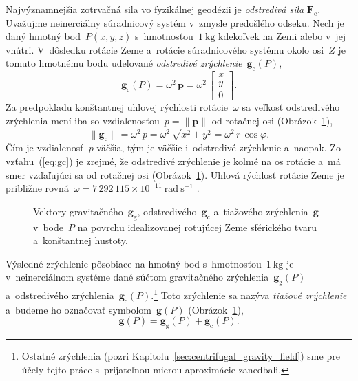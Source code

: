 \documentclass[a4paper,12pt]{book}
\newcommand{\gidx}{\mathrm g}
\newcommand{\cidx}{\mathrm c}
\let\vec\mathbf
\begin{document}
Najvýznamnejšia zotrvačná sila vo fyzikálnej geodézii je \emph{odstredivá sila}
$\vec F_\cidx$.  Uvažujme neinerciálny súradnicový systém v~zmysle predošlého
odseku.  Nech je daný hmotný bod~$P(x, y, z)$ s~hmotnosťou~$1\ \mathrm{kg}$ 
kdekoľvek na Zemi alebo v~jej vnútri.  V~dôsledku rotácie Zeme a~rotácie 
súradnicového systému okolo osi~$Z$ je tomuto hmotnému bodu udeľované 
\emph{odstredivé zrýchlenie}~$\vec g_\cidx(P)$,
%
\begin{equation}
\label{eq:gc}
\vec g_\cidx(P) = \omega^2 \, \vec p =
%
\omega^2 \, \begin{bmatrix}
x\\
y\\
0
\end{bmatrix}
%
{.}
\end{equation}
%
Za predpokladu konštantnej uhlovej rýchlosti rotácie~$\omega$ sa veľkosť
odstredivého zrýchlenia mení iba so vzdialenosťou~$p = \| \vec p \|$ od 
rotačnej osi (Obrázok~\ref{fig:gravity_vector}),
%
\begin{equation}
\| \vec g_\cidx \| = \omega^2 \, p = \omega^2 \, \sqrt{x^2 + y^2} = \omega^2 \, 
r \, \cos\varphi{.}
\end{equation}
%
Čím je vzdialenosť~$p$ väčšia, tým je väčšie i~odstredivé zrýchlenie a~naopak.
Zo vzťahu~(\ref{eq:gc}) je zrejmé, že odstredivé zrýchlenie je kolmé na os
rotácie a~má smer vzďaľujúci sa od rotačnej osi
(Obrázok~\ref{fig:gravity_vector}).  Uhlová rýchlosť rotácie Zeme je približne
rovná~$\omega = 7\, 292\, 115 \times 10^{-11} \ \mathrm{rad} \ \mathrm{s}^{-1}$ 
\parencite{GRS80}{.}

\begin{figure}
\centering

\caption{Vektory gravitačného~$\vec g_\gidx$, odstredivého~$\vec g_\cidx$
a~tiažového zrýchlenia~$\vec g$ v~bode~$P$ na povrchu idealizovanej rotujúcej
Zeme sférického tvaru a~konštantnej hustoty.}
\label{fig:gravity_vector}
\end{figure}

Výsledné zrýchlenie pôsobiace na hmotný bod s~hmotnosťou~$1 \ \mathrm{kg}$ je
v~neinerciálnom systéme dané súčtom gravitačného zrýchlenia~$\vec g_\gidx(P)$
a~odstredivého zrýchlenia~$\vec g_\cidx(P)$.\footnote{Ostatné zrýchlenia (pozri
Kapitolu~\ref{sec:centrifugal_gravity_field}) sme pre účely tejto práce 
s~prijateľnou mierou aproximácie zanedbali.}  Toto zrýchlenie sa nazýva 
\emph{tiažové zrýchlenie} a~budeme ho označovať symbolom~$\vec g(P)$ 
(Obrázok~\ref{fig:gravity_vector}),
%
\begin{equation}
\label{eq:g}
\vec g(P) = \vec g_\gidx(P) + \vec g_\cidx(P){.}
\end{equation}
\end{document}
